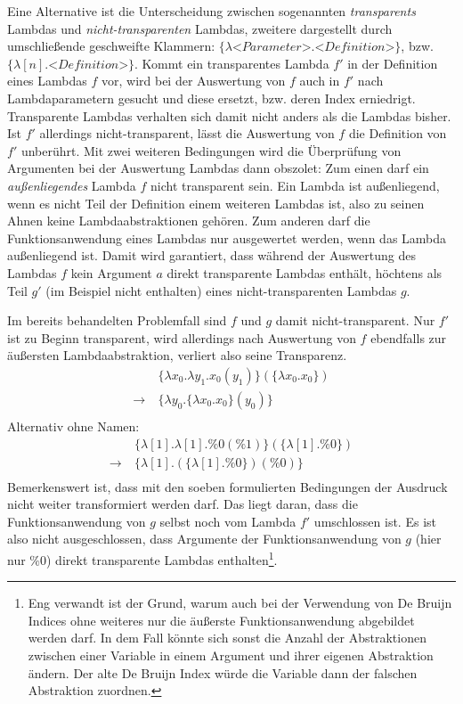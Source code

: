  Eine Alternative ist die Unterscheidung zwischen sogenannten \emph{\glspl{transparent}} Lambdas und \emph{nicht-transparenten} Lambdas, zweitere dargestellt durch umschließende geschweifte Klammern: $\{\lambda \textit{<Parameter>}.\textit{<Definition>}\}$, bzw. $\{\lambda [n].\textit{<Definition>}\}$. Kommt ein transparentes Lambda $f'$ in der Definition eines Lambdas $f$ vor, wird bei der Auswertung von $f$ auch in $f'$ nach Lambdaparametern gesucht und diese ersetzt, bzw. deren Index erniedrigt. Transparente Lambdas verhalten sich damit nicht anders als die Lambdas bisher. Ist $f'$ allerdings nicht-transparent, lässt die Auswertung von $f$ die Definition von $f'$ unberührt. 
 Mit zwei weiteren Bedingungen wird die Überprüfung von Argumenten bei der Auswertung Lambdas dann obszolet: 
 Zum einen darf ein \emph{außenliegendes} Lambda $f$ nicht transparent sein. Ein Lambda ist außenliegend, wenn es nicht Teil der Definition einem weiteren Lambdas ist, also zu seinen Ahnen keine Lambdaabstraktionen gehören. Zum anderen darf die Funktionsanwendung eines Lambdas nur ausgewertet werden, wenn das Lambda außenliegend ist. Damit wird garantiert, dass während der Auswertung des Lambdas $f$ kein Argument $a$ direkt transparente Lambdas enthält, höchtens als Teil $g'$ (im Beispiel nicht enthalten) eines nicht-transparenten Lambdas $g$.

Im bereits behandelten Problemfall sind $f$ und $g$ damit nicht-transparent. Nur $f'$ ist zu Beginn transparent, wird allerdings nach Auswertung von $f$ ebendfalls zur äußersten Lambdaabstraktion, verliert also seine Transparenz. 
\begin{align*}
    ~           &~\{\lambda x_0 .\lambda y_1 .x_0(y_1)\}(\{\lambda x_0 .x_0\}) \\
    \rightarrow &~\{\lambda y_0 .\{\lambda x_0 .x_0\}(y_0)\}\\
\end{align*}
Alternativ ohne Namen:
\begin{align*}
    ~           &~\{\lambda [1] .\lambda [1] .\%0(\%1)\}(\{\lambda [1] .\%0\}) \\
    \rightarrow &~\{\lambda [1] .(\{\lambda [1] .\%0\})(\%0)\}\\
\end{align*}
Bemerkenswert ist, dass mit den soeben formulierten Bedingungen der Ausdruck nicht weiter transformiert werden darf. Das liegt daran, dass die Funktionsanwendung von $g$ selbst noch vom Lambda $f'$ umschlossen ist. Es ist also nicht ausgeschlossen, dass Argumente der Funktionsanwendung von $g$ (hier nur $\%0$) direkt transparente Lambdas enthalten\footnote{Eng verwandt ist der Grund, warum auch bei der Verwendung von De Bruijn Indices ohne weiteres nur die äußerste Funktionsanwendung abgebildet werden darf. In dem Fall könnte sich sonst die Anzahl der Abstraktionen zwischen einer Variable in einem Argument und ihrer eigenen Abstraktion ändern. Der alte De Bruijn Index würde die Variable dann der falschen Abstraktion zuordnen.}.





